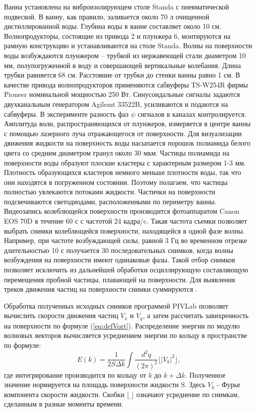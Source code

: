 Ванна установлена на виброизолирующем столе Standa с пневматической подвеской. В ванну, как правило, заливается около 70 л очищенной дистиллированной воды. Глубина воды в ванне составляет около 10 см. Волнопродукторы, состоящие из привода 2 и плунжера 6, монтируются на рамную конструкцию и устанавливаются на столе Standa. Волны на поверхности воды возбуждаются плунжером – трубкой из нержавеющей стали диаметром 10 мм, полупогруженной в воду и совершающей вертикальные колебания. Длина трубки равняется 68 см. Расстояние от трубки до стенки ванны равно 1 см. В качестве привода волнопродукторов применяются сабвуферы TS-W254R фирмы Pioneer номинальной мощностью 250 Вт. Синусоидальные сигналы задаются двухканальным генератором Agilemt 33522B, усиливаются и подаются на сабвуферы. В эксперименте разность фаз $\psi$ сигналов в каналах контролируется. Амплитуда волн, распространяющихся от плунжеров, измеряется в центре ванны с помощью лазерного луча отражающегося от поверхности. Для визуализации движения жидкости на поверхность воды насыпается порошок полиамида белого цвета со средним диаметром гранул около 30 мкм. Частицы полиамида на поверхности воды образуют плоские кластеры с характерным размером 1-3 мм. Плотность образующихся кластеров немного меньше плотности воды, так что они находятся в погруженном состоянии. Поэтому полагаем, что частицы полностью увлекаются потоками жидкости. Частички на поверхности подсвечиваются светодиодами, расположенными по периметру ванны. Видеозапись колеблющейся поверхности производится фотоаппаратом Canon EOS 70D в течение 60 с с частотой 24 кадра/c. Такая частота съемки позволяет выбрать снимки колеблющейся поверхности, находящейся в одной фазе волны. Например, при частоте возбуждающей силы, равной 3 Гц во временном отрезке длительностью 10 с получается 30 последовательных снимков, когда волны возбуждения на поверхности имеют одинаковые фазы. Такой отбор снимков позволяет исключить из дальнейшей обработки осциллирующую составляющую перемещения пробной частицы, плавающей на поверхности. Для выявления треков движения частиц на поверхности снимки суммируются \cite{F8}.

Обработка полученных исходных снимков программой PIVLab \cite{PIVlab, PIVlab1} позволяет вычислить скорости движения частиц $V_x$ и $V_y$, а затем рассчитать завихренность на поверхности по формуле (\ref{eq:defVort}). Распределение энергии по модулю волновых векторов вычисляется усреднением энергии по кольцу в пространстве по формуле:
\begin{equation}
E(k) = \frac{1}{ 2 S \Delta k}\int \frac{d^2 q}{(2 \pi)^2} \lfloor |V_k|^2 \rfloor,
\end{equation}
где интегрирование производится по кольцу от ${k}$ до ${k} + \Delta{k}$. Полученное значение нормируется на площадь поверхности жидкости S. Здесь $V_k$ - Фурье компонента скорости жидкости. Скобки $\lfloor \, \rfloor$ означают усреднение по снимкам, сделанным в разные моменты времени.
	
